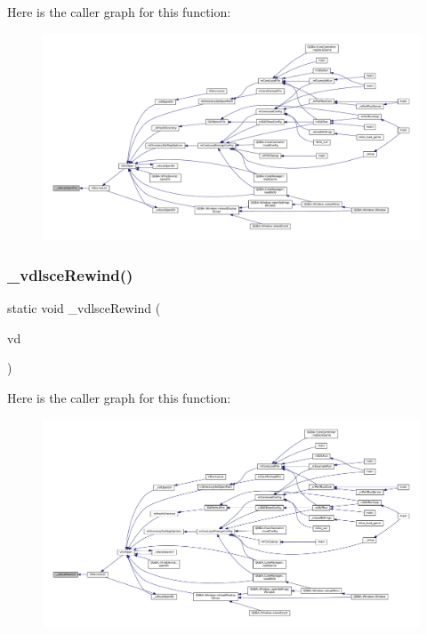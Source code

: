 Here is the caller graph for this function\+:
\nopagebreak
\begin{figure}[H]
\begin{center}
\leavevmode
\includegraphics[width=350pt]{sce-vfs_8c_aa338c926cc1b185d9be42e478649e857_icgraph}
\end{center}
\end{figure}
\mbox{\label{sce-vfs_8c_aa32b8d06f036ca56f6882ea277681784}} 
\subsubsection{\texorpdfstring{\+\_\+vdlsce\+Rewind()}{\_vdlsceRewind()}}
{\footnotesize\ttfamily static void \+\_\+vdlsce\+Rewind (\begin{DoxyParamCaption}\item[{struct V\+Dir $\ast$}]{vd }\end{DoxyParamCaption})\hspace{0.3cm}{\ttfamily [static]}}

Here is the caller graph for this function\+:
\nopagebreak
\begin{figure}[H]
\begin{center}
\leavevmode
\includegraphics[width=350pt]{sce-vfs_8c_aa32b8d06f036ca56f6882ea277681784_icgraph}
\end{center}
\end{figure}
\mbox{\label{sce-vfs_8c_a0117395ca30b8792363d78449fe61630}} 
